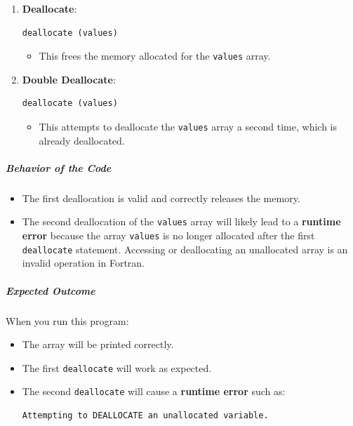 \begin{enumerate}
\begin{itemize}
\begin{verbatim}
1 2 3 4 5
\end{verbatim}
\end{itemize}


\item \textbf{Deallocate}:

\begin{verbatim}
deallocate (values)
\end{verbatim}

\begin{itemize}
\item This frees the memory allocated for the \texttt{values} array.
\end{itemize}


\item \textbf{Double Deallocate}:

\begin{verbatim}
deallocate (values)
\end{verbatim}

\begin{itemize}
\item This attempts to deallocate the \texttt{values} array a second time, which is already deallocated.
\end{itemize}
\end{enumerate}

\subparagraph{Behavior of the Code}

\begin{itemize}
\item The first deallocation is valid and correctly releases the memory.
\item The second deallocation of the \texttt{values} array will likely lead to a \textbf{runtime error} because the array \texttt{values} is no longer allocated after the first \texttt{deallocate} statement. Accessing or deallocating an unallocated array is an invalid operation in Fortran.
\end{itemize}

\subparagraph{Expected Outcome}

When you run this program:

\begin{itemize}
\item The array will be printed correctly.
\item The first \texttt{deallocate} will work as expected.
\item The second \texttt{deallocate} will cause a \textbf{runtime error} such as:

\begin{verbatim}
Attempting to DEALLOCATE an unallocated variable.
\end{verbatim}
\end{itemize}

